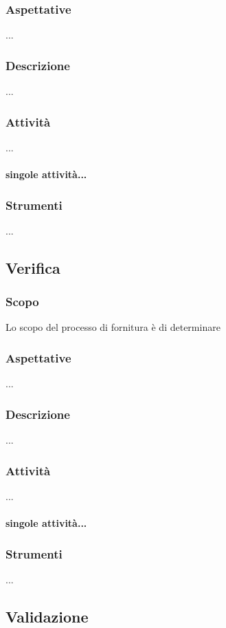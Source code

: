     \subsubsection{Aspettative}
    ...
    \subsubsection{Descrizione}
    ...
    \subsubsection{Attività}
    ...
    \paragraph{singole attività...}
    \subsubsection{Strumenti}
    ...

\subsection{Verifica}
\label{verifica}
    \subsubsection{Scopo}
    Lo scopo del processo di fornitura è di determinare
    \subsubsection{Aspettative}
    ...
    \subsubsection{Descrizione}
    ...
    \subsubsection{Attività}
    ...
    \paragraph{singole attività...}
    \subsubsection{Strumenti}
    ...

\subsection{Validazione}
